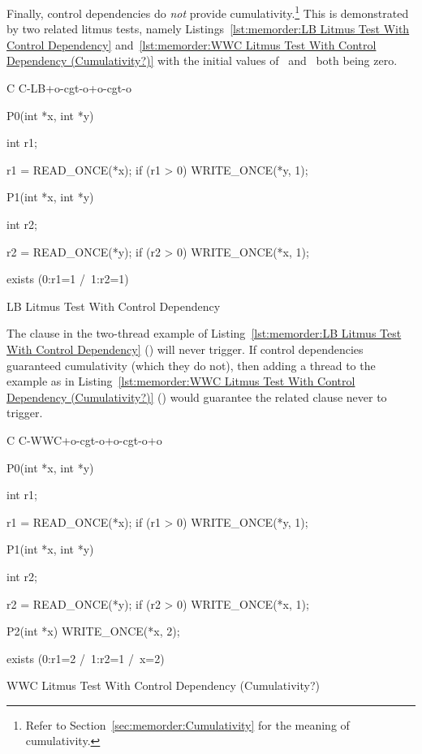 Finally, control dependencies do \emph{not} provide cumulativity.\footnote{
	Refer to Section~\ref{sec:memorder:Cumulativity} for
	the meaning of cumulativity.}
This is demonstrated by two related litmus tests, namely
Listings~\ref{lst:memorder:LB Litmus Test With Control Dependency}
and~\ref{lst:memorder:WWC Litmus Test With Control Dependency (Cumulativity?)}
with the initial values
of~ and~ both being zero.
\fi

\begin{listing}[tb]
{ \scriptsize
\begin{verbbox}[\LstLineNo]
C C-LB+o-cgt-o+o-cgt-o
{
}

P0(int *x, int *y)
{
  int r1;

  r1 = READ_ONCE(*x);
  if (r1 > 0)
    WRITE_ONCE(*y, 1);
}

P1(int *x, int *y)
{
  int r2;

  r2 = READ_ONCE(*y);
  if (r2 > 0)
    WRITE_ONCE(*x, 1);
}

exists (0:r1=1 /\ 1:r2=1)
\end{verbbox}
}
\centering
\theverbbox
\caption{LB Litmus Test With Control Dependency}
\label{lst:memorder:LB Litmus Test With Control Dependency}
\end{listing}

The  clause in the two-thread example of
Listing~\ref{lst:memorder:LB Litmus Test With Control Dependency}
()
will never trigger.
If control dependencies guaranteed cumulativity (which they do
not), then adding a thread to the example as in
Listing~\ref{lst:memorder:WWC Litmus Test With Control Dependency (Cumulativity?)}
()
would guarantee the related  clause never to trigger.

\begin{listing}
{ \scriptsize
\begin{verbbox}[\LstLineNo]
C C-WWC+o-cgt-o+o-cgt-o+o
{
}

P0(int *x, int *y)
{
  int r1;

  r1 = READ_ONCE(*x);
  if (r1 > 0)
    WRITE_ONCE(*y, 1);
}

P1(int *x, int *y)
{
  int r2;

  r2 = READ_ONCE(*y);
  if (r2 > 0)
    WRITE_ONCE(*x, 1);
}

P2(int *x)
{
  WRITE_ONCE(*x, 2);
}

exists (0:r1=2 /\ 1:r2=1 /\ x=2)
\end{verbbox}
}
\centering
\theverbbox
\caption{WWC Litmus Test With Control Dependency (Cumulativity?)}
\label{lst:memorder:WWC Litmus Test With Control Dependency (Cumulativity?)}
\end{listing}

